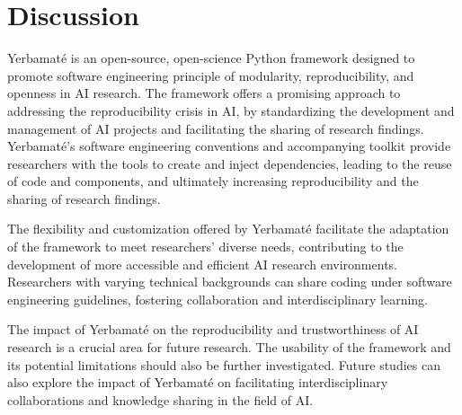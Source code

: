 \section{Discussion}

Yerbamaté is an open-source, open-science Python framework designed to promote software engineering principle of modularity, reproducibility, and openness in AI research. The framework offers a promising approach to addressing the reproducibility crisis in AI, by standardizing the development and management of AI projects and facilitating the sharing of research findings. Yerbamaté's software engineering conventions and accompanying toolkit provide researchers with the tools to create and inject dependencies, leading to the reuse of code and components, and ultimately increasing reproducibility and the sharing of research findings.


The flexibility and customization offered by Yerbamaté facilitate the adaptation of the framework to meet researchers' diverse needs, contributing to the development of more accessible and efficient AI research environments. Researchers with varying technical backgrounds can share coding under software engineering guidelines, fostering collaboration and interdisciplinary learning.

The impact of Yerbamaté on the reproducibility and trustworthiness of AI research is a crucial area for future research. The usability of the framework and its potential limitations should also be further investigated. Future studies can also explore the impact of Yerbamaté on facilitating interdisciplinary collaborations and knowledge sharing in the field of AI.

 